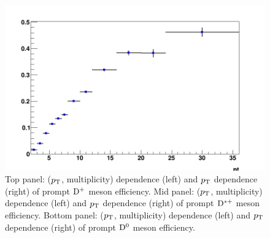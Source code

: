 \begin{figure}[!htp]
	\includegraphics[width=.48\linewidth]{figures/Effs/EfficiencyMap_1D_Dzero_c_RefPtBins_wLimAcc_Plot.png}  %
	
\caption{Top panel: ($p_{\rm T}$, multiplicity) dependence (left) and $p_{\rm T}$  dependence (right) of prompt ${\rm D^+}$ meson efficiency.
Mid panel: ($p_{\rm T}$, multiplicity) dependence (left) and $p_{\rm T}$  dependence (right) of prompt ${\rm D^{*+}}$ meson efficiency.
Bottom panel: ($p_{\rm T}$, multiplicity) dependence (left) and $p_{\rm T}$  dependence (right) of prompt ${\rm D^0}$ meson efficiency.
}
	\label{fig:dEffPrompt}	
\end{figure}


